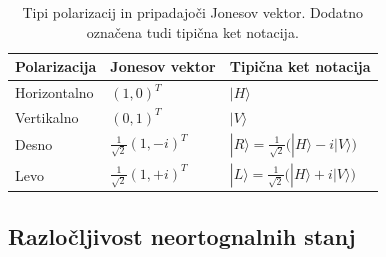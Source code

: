 \documentclass[12pt]{article}
\begin{document}
\begin{table}[]
\centering
\renewcommand{\arraystretch}{1.5} %
\begin{tabular}{|l|l|l|}

\hline
\textbf{Polarizacija} & \textbf{Jonesov vektor}                                       & \textbf{Tipična ket notacija}                                                               \\ \hline
Horizontalno          & $ (1,0)^T $                          & $ |H\rangle $                                                                               \\ \hline
Vertikalno            & $(0,1)^T$                          & $ |V\rangle $                                                                               \\ \hline
Desno                 & ${\frac  {1}{{\sqrt  2}}}{(1, -i)^T}$ & $ { |R\rangle ={\frac {1}{\sqrt {2}}}{\big (}|H\rangle -i|V\rangle {\big )}} $ \\ \hline
Levo                  & $ {\frac  {1}{{\sqrt  2}}}{(1, +i)^T} $ & $ { |L\rangle ={\frac {1}{\sqrt {2}}}{\big (}|H\rangle +i|V\rangle {\big )}} $ \\ \hline
\end{tabular}
\caption{Tipi polarizacij in pripadajoči Jonesov vektor. Dodatno označena tudi tipična ket notacija. \cite{JonesCalculus2023} }
\label{tab:pol}
\end{table}

\subsection{Razločljivost neortognalnih stanj}
\end{document}
